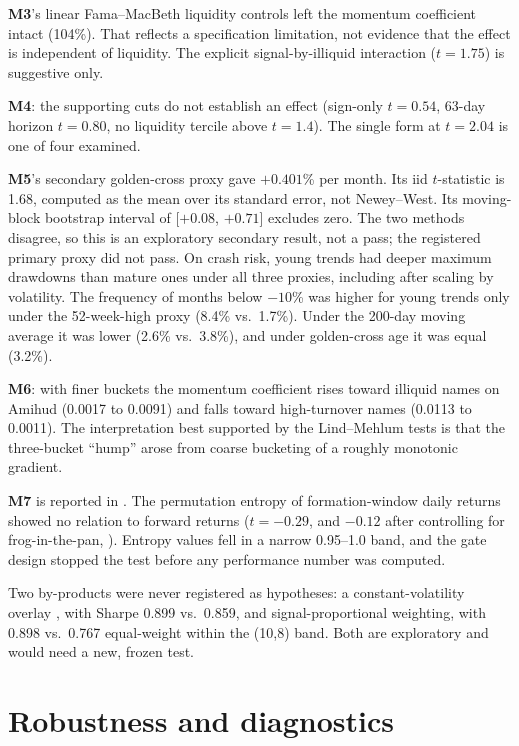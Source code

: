 \documentclass[11pt]{article}
\begin{document}
\textbf{M3}'s linear Fama--MacBeth liquidity controls left the momentum coefficient
intact (104\%). That reflects a specification limitation, not evidence that the effect
is independent of liquidity. The explicit signal-by-illiquid interaction ($t=1.75$) is
suggestive only.

\textbf{M4}: the supporting cuts do not establish an effect (sign-only $t=0.54$, 63-day
horizon $t=0.80$, no liquidity tercile above $t=1.4$). The single form at $t=2.04$ is one
of four examined.

\textbf{M5}'s secondary golden-cross proxy gave $+0.401$\% per month. Its iid
$t$-statistic is 1.68, computed as the mean over its standard error, not Newey--West. Its
moving-block bootstrap interval of [$+0.08$, $+0.71$] excludes zero. The two methods
disagree, so this is an exploratory secondary result, not a pass; the registered primary
proxy did not pass. On crash risk, young trends had deeper maximum drawdowns than mature
ones under all three proxies, including after scaling by volatility. The frequency of
months below $-10$\% was higher for young trends only under the 52-week-high proxy (8.4\%
vs.\ 1.7\%). Under the 200-day moving average it was lower (2.6\% vs.\ 3.8\%), and under
golden-cross age it was equal (3.2\%).

\textbf{M6}: with finer buckets the momentum coefficient rises toward illiquid names on
Amihud (0.0017 to 0.0091) and falls toward high-turnover names (0.0113 to 0.0011). The
interpretation best supported by the Lind--Mehlum tests \citep{lind2010} is that the
three-bucket ``hump'' arose from coarse bucketing of a roughly monotonic gradient.

\textbf{M7} is reported in \citet{sahi_pathtexture}. The permutation entropy
\citep{bandt2002} of formation-window daily returns showed no relation to forward returns
($t=-0.29$, and $-0.12$ after controlling for frog-in-the-pan, \citealp{da2014}).
Entropy values fell in a narrow 0.95--1.0 band, and the gate design stopped the test
before any performance number was computed.

Two by-products were never registered as hypotheses: a constant-volatility overlay
\citep{barroso2015}, with Sharpe 0.899 vs.\ 0.859, and signal-proportional weighting,
with 0.898 vs.\ 0.767 equal-weight within the (10,8) band. Both are exploratory and would
need a new, frozen test.

\section{Robustness and diagnostics}\label{sec:robust}
\end{document}
